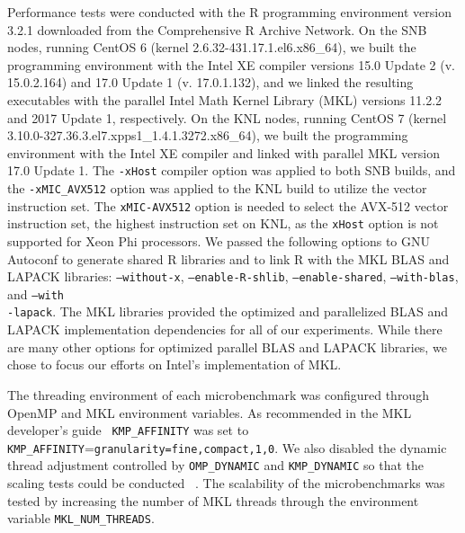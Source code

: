 Performance tests were conducted with the R programming environment version 3.2.1
downloaded from the Comprehensive R Archive Network. On the SNB nodes, running CentOS 6
(kernel 2.6.32-431.17.1.el6.x86\_64), we built the programming environment with the Intel
XE compiler versions 15.0 Update 2 (v. 15.0.2.164) and 17.0 Update 1 (v. 17.0.1.132), and
we linked the resulting executables with the parallel Intel Math Kernel Library (MKL)
versions 11.2.2 and 2017 Update 1, respectively. On the KNL nodes, running CentOS 7
(kernel 3.10.0-327.36.3.el7.xpps1\_1.4.1.3272.x86\_64), we built the programming
environment with the Intel XE compiler and linked with parallel MKL version 17.0 Update 1.
The \texttt{-xHost} compiler option was applied to both SNB builds, and the
\texttt{-xMIC\_AVX512} option was applied to the KNL build to utilize the
vector instruction set. The \texttt{xMIC-AVX512} option is needed to select the AVX-512
vector instruction set, the highest instruction set on KNL, as the
\texttt{xHost} option is not supported for Xeon Phi processors. We passed the following
options to GNU Autoconf to generate shared R libraries and to link R with the MKL BLAS and
LAPACK libraries: \texttt{--without-x}, \texttt{--enable-R-shlib},
\texttt{--enable-shared}, \texttt{--with-blas}, and \texttt{--with\\-lapack}. The MKL
libraries provided the optimized and parallelized BLAS and LAPACK implementation
dependencies for all of our experiments. While there are many other options for optimized parallel BLAS and LAPACK libraries, we chose to focus our efforts on Intel's implementation of MKL.

The threading environment of each microbenchmark was configured through OpenMP and MKL
environment variables. As recommended in the MKL developer's guide~\cite{intel:mkl2017}
\texttt{KMP\_AFFINITY} was set to \texttt{KMP\_AFFINITY}=\texttt{granularity=fine,compact,1,0}.
We also disabled the dynamic thread adjustment controlled by \texttt{OMP\_DYNAMIC} and
\texttt{KMP\_DYNAMIC} so that the scaling tests could be conducted ~\cite{intel:cpp2015,
intel:cpp2017, intel:mkl11_2, intel:mkl2017}. The scalability of the microbenchmarks was
tested by increasing the number of MKL threads through the environment variable
\texttt{MKL\_NUM\_THREADS}.

